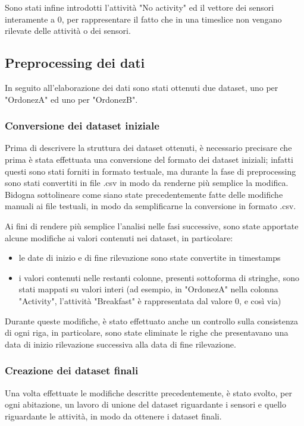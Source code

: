 \documentclass[10pt,a4paper]{article}
\begin{document}
	Sono stati infine introdotti l'attività "No activity" ed il vettore dei sensori interamente a 0, per rappresentare il fatto che in una timeslice non vengano rilevate delle attività o dei sensori.

	\subsection{Preprocessing dei dati}
	In seguito all'elaborazione dei dati sono stati ottenuti due dataset, uno per "OrdonezA" ed uno per "OrdonezB".
	\subsubsection{Conversione dei dataset iniziale}
	Prima di descrivere la struttura dei dataset ottenuti, è necessario precisare che prima è stata effettuata una conversione del formato dei dataset iniziali; infatti questi sono stati forniti in formato testuale, ma durante la fase di preprocessing sono stati convertiti in file .csv in modo da renderne più semplice la modifica. Bidogna sottolineare come siano state precedentemente fatte delle modifiche manuali ai file testuali, in modo da semplificarne la conversione in formato .csv.

	Ai fini di rendere più semplice l'analisi nelle fasi successive, sono state apportate alcune modifiche ai valori contenuti nei dataset, in particolare:
	\begin{itemize}
		\item le date di inizio e di fine rilevazione sono state convertite in timestamps
		\item i valori contenuti nelle restanti colonne, presenti sottoforma di stringhe, sono stati mappati su valori interi
		(ad esempio, in "OrdonezA" nella colonna "Activity", l'attività "Breakfast" è rappresentata dal valore 0, e così via)
	\end{itemize}

	Durante queste modifiche, è stato effettuato anche un controllo sulla consistenza di ogni riga, in particolare, sono state eliminate le righe che presentavano una data di inizio rilevazione successiva alla data di fine rilevazione.

	\subsubsection{Creazione dei dataset finali}
	Una volta effettuate le modifiche descritte precedentemente, è stato svolto, per ogni abitazione, un lavoro di unione del dataset riguardante i sensori e quello riguardante le attività, in modo da ottenere i dataset finali.
\end{document}
